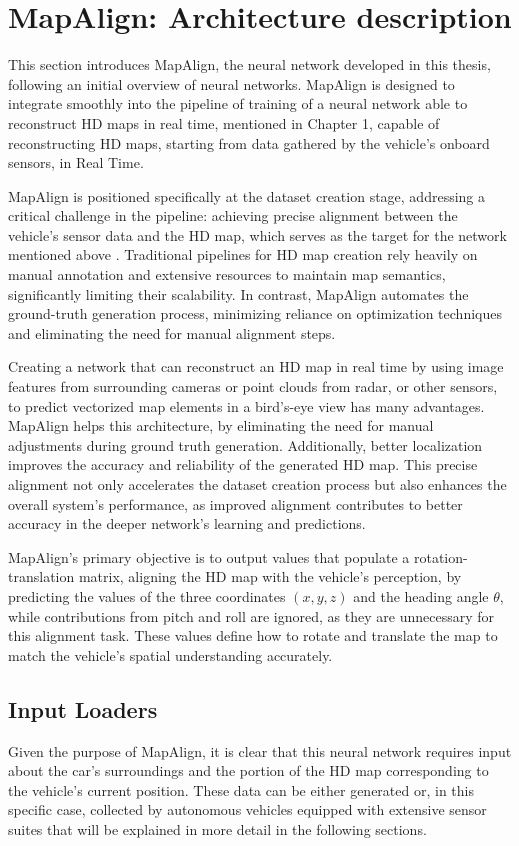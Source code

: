 \section{MapAlign: Architecture description}
This section introduces MapAlign, the neural network developed in this thesis, following an initial overview of neural networks. MapAlign is designed to integrate smoothly into the pipeline of training of a neural network able to reconstruct HD maps in real time, mentioned in Chapter 1, capable of reconstructing HD maps, starting from data gathered by the vehicle's onboard sensors, in Real Time.

MapAlign is positioned specifically at the dataset creation stage, addressing a critical challenge in the pipeline: achieving precise alignment between the vehicle's sensor data and the HD map, which serves as the target for the network mentioned above \cite{Li_HDMapNet_2022}. Traditional pipelines for HD map creation rely heavily on manual annotation and extensive resources to maintain map semantics, significantly limiting their scalability. In contrast, MapAlign automates the ground-truth generation process, minimizing reliance on optimization techniques and eliminating the need for manual alignment steps.

Creating a network that can reconstruct an HD map in real time by using image features from surrounding cameras or point clouds from radar, or other sensors, to predict vectorized map elements in a bird’s-eye view has many advantages. MapAlign helps this architecture, by eliminating the need for manual adjustments during ground truth generation. Additionally, better localization improves the accuracy and reliability of the generated HD map. This precise alignment not only accelerates the dataset creation process but also enhances the overall system’s performance, as improved alignment contributes to better accuracy in the deeper network's learning and predictions.


MapAlign’s primary objective is to output values that populate a rotation-translation matrix, aligning the HD map with the vehicle’s perception, by predicting the values of the three coordinates \( (x, y, z) \) and the heading angle \( \theta \), while contributions from pitch and roll are ignored, as they are unnecessary for this alignment task. These values define how to rotate and translate the map to match the vehicle's spatial understanding accurately. 

\subsection{Input Loaders}
Given the purpose of MapAlign, it is clear that this neural network requires input about the car's surroundings and the portion of the HD map corresponding to the vehicle's current position. These data can be either generated or, in this specific case, collected by autonomous vehicles equipped with extensive sensor suites that will be explained in more detail in the following sections.

